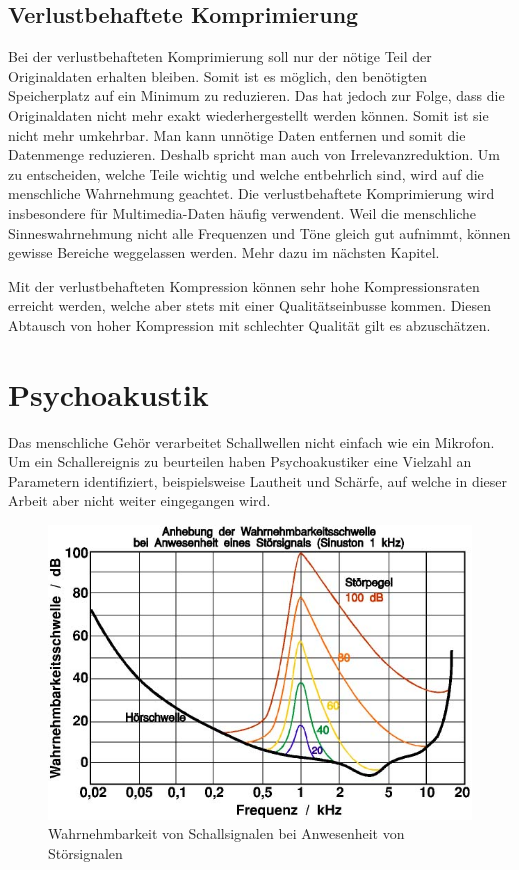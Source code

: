 \begin{refsection}
\subsection{Verlustbehaftete Komprimierung}
Bei der verlustbehafteten Komprimierung soll nur der nötige Teil der Originaldaten erhalten bleiben.
Somit ist es möglich, den benötigten Speicherplatz auf ein Minimum zu reduzieren.
Das hat jedoch zur Folge, dass die Originaldaten nicht mehr exakt wiederhergestellt werden können. 
Somit ist sie nicht mehr umkehrbar.
Man kann unnötige Daten entfernen und somit die Datenmenge reduzieren.
Deshalb spricht man auch von Irrelevanzreduktion.
Um zu entscheiden, welche Teile wichtig und welche entbehrlich sind, wird auf die menschliche Wahrnehmung geachtet.
Die verlustbehaftete Komprimierung wird insbesondere für Multimedia-Daten häufig verwendent.
Weil die menschliche Sinneswahrnehmung nicht alle Frequenzen und Töne gleich gut aufnimmt, können gewisse Bereiche weggelassen werden.
Mehr dazu im nächsten Kapitel.

Mit der verlustbehafteten Kompression können sehr hohe Kompressionsraten erreicht werden, welche aber stets mit einer Qualitätseinbusse kommen.
Diesen Abtausch von hoher Kompression mit schlechter Qualität gilt es abzuschätzen.

\section{Psychoakustik}
Das menschliche Gehör verarbeitet Schallwellen nicht einfach wie ein Mikrofon.
Um ein Schallereignis zu beurteilen haben Psychoakustiker eine Vielzahl an Parametern identifiziert, beispielsweise Lautheit und Schärfe, auf welche in dieser Arbeit aber nicht weiter eingegangen wird.

\begin{figure}[h]
	\centering
	\includegraphics[width=0.6\linewidth]{papers/compress/Bilder/Akustik_Mithoerschwelle2}
	\caption{Wahrnehmbarkeit von Schallsignalen bei Anwesenheit von Störsignalen \cite{skript:Akustik2}}
	\label{fig:Wahrnehmbarkeitsschwelle}
\end{figure}


\end{refsection}
